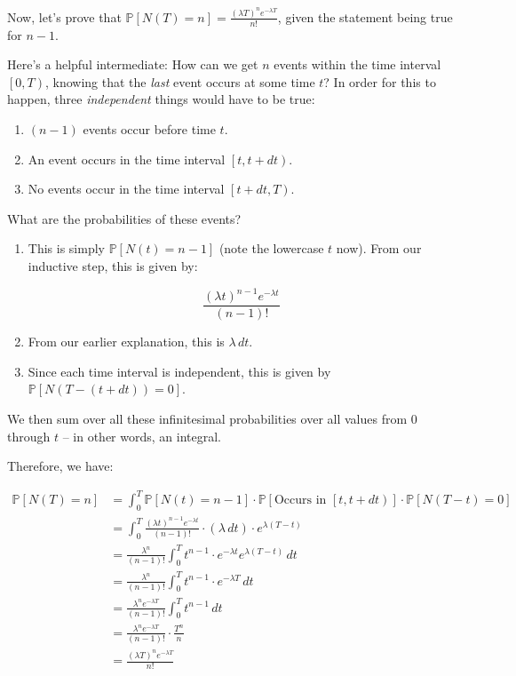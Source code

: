 Now, let's prove that $\mathbb{P}\left[N(T) = n\right] = \frac{(\lambda T)^n e^{-\lambda T}}{n!}$, given the statement being true for $n-1$. 

Here's a helpful intermediate: How can we get $n$ events within the time interval $\left[0, T\right)$, knowing that the \emph{last} event occurs at some time $t$? In order for this to happen, three \emph{independent} things would have to be true:

\begin{enumerate}
\item $(n-1)$ events occur before time $t$. 
\item An event occurs in the time interval $\left[t, t + dt\right)$.
\item No events occur in the time interval $\left[t + dt, T\right)$. 
\end{enumerate}

What are the probabilities of these events?

\begin{enumerate}
\item This is simply $\mathbb{P}\left[N(t) = n-1\right]$ (note the lowercase $t$ now). From our inductive step, this is given by:

\begin{equation*}
\frac{(\lambda t)^{n-1} e^{-\lambda t}}{(n-1)!}
\end{equation*}

\item From our earlier explanation, this is $\lambda \, dt$. 
\item Since each time interval is independent, this is given by $\mathbb{P}\left[N(T - (t + dt)) = 0\right]$. %
\end{enumerate}


We then sum over all these infinitesimal probabilities over all values from 0 through $t$ -- in other words, an integral. 

Therefore, we have:

\begin{align*}
\mathbb{P}\left[N(T) = n\right] &= \int_{0}^{T} \mathbb{P}\left[N(t) = n-1\right] \cdot \mathbb{P}\left[\text{Occurs in $\left[t, t+dt\right)$}\right] \cdot \mathbb{P}\left[N(T-t) = 0\right] \\
&= \int_{0}^{T} \frac{(\lambda t)^{n-1} e^{-\lambda t}}{(n-1)!} \cdot (\lambda \, dt) \cdot e^{\lambda(T-t)} \\
&= \frac{\lambda^n}{(n-1)!} \int_{0}^{T} t^{n-1} \cdot e^{-\lambda t}e^{\lambda(T-t)} \, dt \\
&= \frac{\lambda^n}{(n-1)!} \int_{0}^{T} t^{n-1} \cdot e^{-\lambda T} \, dt \\
&= \frac{\lambda^n  e^{-\lambda T}}{(n-1)!} \int_{0}^{T}  t^{n-1} \, dt \\
&= \frac{\lambda^n  e^{-\lambda T}}{(n-1)!} \cdot \frac{T^n}{n} \\
&= \frac{(\lambda T)^n  e^{-\lambda T}}{n!} \\
\end{align*}



